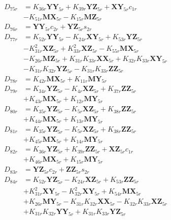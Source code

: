 \begin{align}
D_{75r} &= K_{36r}\mathbf{YY}_{5r} + K_{39r}\mathbf{YZ}_{5r} + \mathbf{XY}_{5r}c_{1r}  \nonumber \\
&- K_{51r}\mathbf{MX}_{5r} - K_{15r}\mathbf{MZ}_{5r} \nonumber \\
D_{76r} &= \mathbf{YY}_{5r}c_{2r} + \mathbf{YZ}_{5r}s_{2r} \nonumber \\
D_{77r} &= K_{52r}\mathbf{YY}_{5r} - K_{24r}\mathbf{XY}_{5r} + K_{53r}\mathbf{YZ}_{5r}  \nonumber \\
&- K_{31r}^2\mathbf{XZ}_{5r} + K_{33r}^2\mathbf{XZ}_{5r} - K_{55r}\mathbf{MX}_{5r}  \nonumber \\
&- K_{26r}\mathbf{MZ}_{5r} + K_{31r}K_{33r}\mathbf{XX}_{5r} + K_{32r}K_{33r}\mathbf{XY}_{5r}  \nonumber \\
&- K_{31r}K_{32r}\mathbf{YZ}_{5r} - K_{31r}K_{33r}\mathbf{ZZ}_{5r} \nonumber \\
D_{78r} &= K_{42r}\mathbf{MX}_{5r} + K_{11r}\mathbf{MY}_{5r} \nonumber \\
D_{79r} &= K_{34r}\mathbf{YZ}_{5r} - K_{4r}\mathbf{XZ}_{5r} + K_{37r}\mathbf{ZZ}_{5r}  \nonumber \\
&+ K_{43r}\mathbf{MX}_{5r} + K_{12r}\mathbf{MY}_{5r} \nonumber \\
D_{80r} &= K_{35r}\mathbf{YZ}_{5r} - K_{5r}\mathbf{XZ}_{5r} + K_{38r}\mathbf{ZZ}_{5r}  \nonumber \\
&+ K_{44r}\mathbf{MX}_{5r} + K_{13r}\mathbf{MY}_{5r} \nonumber \\
D_{81r} &= K_{35r}\mathbf{YZ}_{5r} - K_{5r}\mathbf{XZ}_{5r} + K_{38r}\mathbf{ZZ}_{5r}  \nonumber \\
&+ K_{45r}\mathbf{MX}_{5r} + K_{14r}\mathbf{MY}_{5r} \nonumber \\
D_{82r} &= K_{36r}\mathbf{YZ}_{5r} + K_{39r}\mathbf{ZZ}_{5r} + \mathbf{XZ}_{5r}c_{1r}  \nonumber \\
&+ K_{46r}\mathbf{MX}_{5r} + K_{15r}\mathbf{MY}_{5r} \nonumber \\
D_{83r} &= \mathbf{YZ}_{5r}c_{2r} + \mathbf{ZZ}_{5r}s_{2r} \nonumber \\
D_{84r} &= K_{52r}\mathbf{YZ}_{5r} - K_{24r}\mathbf{XZ}_{5r} + K_{53r}\mathbf{ZZ}_{5r}  \nonumber \\
&+ K_{31r}^2\mathbf{XY}_{5r} - K_{32r}^2\mathbf{XY}_{5r} + K_{54r}\mathbf{MX}_{5r}  \nonumber \\
&+ K_{26r}\mathbf{MY}_{5r} - K_{31r}K_{32r}\mathbf{XX}_{5r} - K_{32r}K_{33r}\mathbf{XZ}_{5r}  \nonumber \\
&+ K_{31r}K_{32r}\mathbf{YY}_{5r} + K_{31r}K_{33r}\mathbf{YZ}_{5r} \nonumber \\

\end{align}
